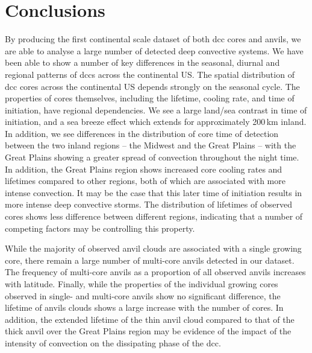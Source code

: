 

\section{Conclusions}  %

By producing the first continental scale dataset of both \acrshort{dcc} cores and anvils, we are able to analyse a large number of detected deep convective systems.
We have been able to show a number of key differences in the seasonal, diurnal and regional patterns of \acrshort{dcc}s across the continental US.
The spatial distribution of \acrshort{dcc} cores across the continental US depends strongly on the seasonal cycle.
The properties of cores themselves, including the lifetime, cooling rate, and time of initiation, have regional dependencies.
We see a large land/sea contrast in time of initiation, and a sea breeze effect which extends for approximately 200\,\unit{km} inland.
In addition, we see differences in the distribution of core time of detection between the two inland regions -- the Midwest and the Great Plains -- with the Great Plains showing a greater spread of convection throughout the night time.
In addition, the Great Plains region shows increased core cooling rates and lifetimes compared to other regions, both of which are associated with more intense convection.
It may be the case that this later time of initiation results in more intense deep convective storms.
The distribution of lifetimes of observed cores shows less difference between different regions, indicating that a number of competing factors may be controlling this property.

While the majority of observed anvil clouds are associated with a single growing core, there remain a large number of multi-core anvils detected in our dataset.
The frequency of multi-core anvils as a proportion of all observed anvils increases with latitude.
Finally, while the properties of the individual growing cores observed in single- and multi-core anvils show no significant difference, the lifetime of anvils clouds shows a large increase with the number of cores.
In addition, the extended lifetime of the thin anvil cloud compared to that of the thick anvil over the Great Plains region may be evidence of the impact of the intensity of convection on the dissipating phase of the \acrshort{dcc}.

